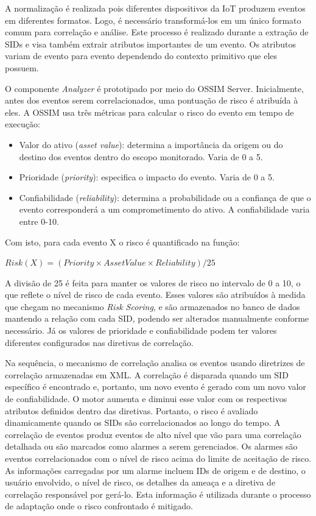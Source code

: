 \documentclass[tid,table]{texufpel} %
\begin{document}
A normalização é realizada pois diferentes dispositivos da IoT produzem eventos em diferentes formatos. Logo, é necessário transformá-los em um único formato comum para correlação e análise. Este processo é realizado durante a extração de SIDs e visa também extrair atributos importantes de um evento. Os atributos variam de evento para evento dependendo do contexto primitivo que eles possuem.

O componente \textit{Analyzer} é prototipado por meio do OSSIM Server. Inicialmente, antes dos eventos serem correlacionados, uma pontuação de risco é atribuída à eles. A OSSIM usa três métricas para calcular o risco do evento em tempo de execução:

\begin{itemize}
\item Valor do ativo (\textit{asset value}): determina a importância da origem ou do destino dos eventos dentro do escopo monitorado. Varia de 0 a 5.
\item Prioridade (\textit{priority}): especifica o impacto do evento. Varia de 0 a 5.
\item Confiabilidade (\textit{reliability}): determina a probabilidade ou a confiança de que o evento corresponderá a um comprometimento do ativo. A confiabilidade varia entre 0-10.

\end{itemize}

Com isto, para cada evento X o risco é quantificado na função:

\begin{center}
\begin{math}
Risk(X) = (Priority \times AssetV alue \times Reliability)/25 
\end{math}
\end{center}

A divisão de 25 é feita para manter os valores de risco no intervalo de 0 a 10, o que reflete o nível de risco de cada evento. Esses valores são atribuídos à medida que chegam no mecanismo \textit{Risk Scoring}, e são armazenados no banco de dados mantendo a relação com cada SID, podendo ser alterados manualmente conforme necessário. Já os valores de prioridade e confiabilidade podem ter valores diferentes configurados nas diretivas de correlação.

Na sequência, o mecanismo de correlação analisa os eventos usando diretrizes de correlação armazenadas em XML. A correlação é disparada quando um SID específico é encontrado e, portanto, um novo evento é gerado com um novo valor de confiabilidade. O motor aumenta e diminui esse valor com os respectivos atributos definidos dentro das diretivas. Portanto, o risco é avaliado dinamicamente quando os SIDs são correlacionados ao longo do tempo. A correlação de eventos produz eventos de alto nível que vão para uma correlação detalhada ou são marcados como alarmes a serem gerenciados. Os alarmes são eventos correlacionados com o nível de risco acima do limite de aceitação de risco. As informações carregadas por um alarme incluem IDs de origem e de destino, o usuário envolvido, o nível de risco, os detalhes da ameaça e a diretiva de correlação responsável por gerá-lo. Esta informação é utilizada durante o processo de adaptação onde o risco confrontado é mitigado.
\end{document}
